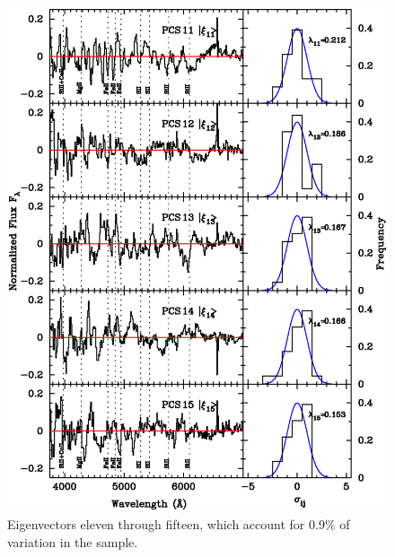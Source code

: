 \begin{figure}[htp]
\begin{center}
\includegraphics[angle=0,scale=0.8]{./figures/pca/20SNe_PCS_11to15_areanorm.ps}
\end{center}
\caption{
Eigenvectors eleven through fifteen, which account for 0.9\% of variation in the sample. 
}
\label{fig:eigen3}
\end{figure}
